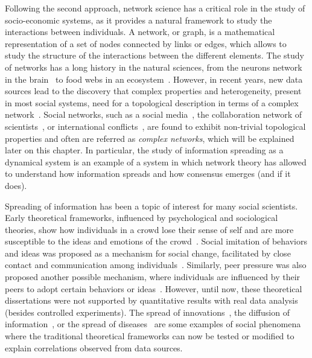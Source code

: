 Following the second approach, network science has a critical role in the study of socio-economic systems, as it provides a natural framework to study the interactions between individuals. A network, or graph, is a mathematical representation of a set of nodes connected by links or edges, which allows to study the structure of the interactions between the different elements. The study of networks has a long history in the natural sciences, from the neurons network in the brain~\cite{sporns-2004} to food webs in an ecosystem~\cite{ings-2008, elith-2009, bastolla-2009}. However, in recent years, new data sources lead to the discovery that complex properties and heterogeneity, present in most social systems, need for a topological description in terms of a complex network~\cite{newman-book, dorogovtsev2002evolution, boccaletti2006complex}. Social networks, such as a social media~\cite{dunbar-2015}, the collaboration network of scientists~\cite{newman-coll-2001,radicchi-2008}, or international conflicts~\cite{hafnerburton-2009, diaz2023network}, are found to exhibit non-trivial topological properties and often are referred as \textit{complex networks}, which will be explained later on this chapter. In particular, the study of information spreading as a dynamical system is an example of a system in which network theory has allowed to understand how information spreads and how consensus emerges (and if it does).

Spreading of information has been a topic of interest for many social scientists. Early theoretical frameworks, influenced by psychological and sociological theories, show how individuals in a crowd lose their sense of self and are more susceptible to the ideas and emotions of the crowd~\cite{le2023crowd}. Social imitation of behaviors and ideas was proposed as a mechanism for social change, facilitated by close contact and communication among individuals~\cite{kanter-1971}. Similarly, peer pressure was also proposed another possible mechanism, where individuals are influenced by their peers to adopt certain behaviors or ideas~\cite{granovetter-1978, brown-1986}. However, until now, these theoretical dissertations were not supported by quantitative results with real data analysis (besides controlled experiments). The spread of innovations~\cite{rogers2014}, the diffusion of information~\cite{valente-1996}, or the spread of diseases~\cite{anderson1991infectious} are some examples of social phenomena where the traditional theoretical frameworks can now be tested or modified to explain correlations observed from data sources.

